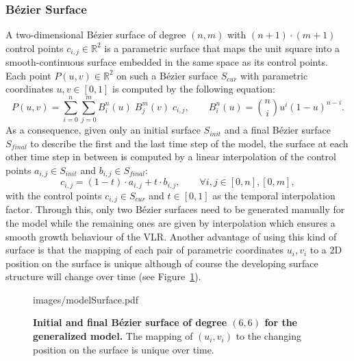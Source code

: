 \documentclass[11pt,a4paper, draft]{article}
\begin{document}
\subsubsection{B\'ezier Surface}
A two-dimensional B\'ezier surface of degree $(n, m)$ with $(n+1) \cdot (m+1)$ control points $c_{i, j} \in \mathbb{R}^2$ is a parametric surface that maps the unit square into a smooth-continuous surface embedded in the same space as its control points. Each point $P(u, v) \in \mathbb{R}^2$ on such a B\'ezier surface $S_{cur}$ with parametric coordinates $u ,v \in [0,1]$ is computed by the following equation:
\begin{equation}
P(u, v) = \sum_{i=0}^{n} \sum_{j=0}^{m} B_{i}^{n} (u) \; B_{j}^{m} (v) \; c_{i,j}, \qquad B_{i}^{n} (u) = \binom{n}{i} u^i (1-u)^{n-i}.
\end{equation}
As a consequence, given only an initial surface $S_{init}$ and a final B\'ezier surface $S_{final}$ to describe the first and the last time step of the model, the surface at each other time step in between is computed by a linear interpolation of the control points $a_{i,j} \in S_{init}$ and $b_{i,j} \in S_{final}$:
\begin{equation}
c_{i,j} = (1-t) \cdot a_{i,j} + t \cdot b_{i,j}, \qquad \forall i, j \in [0, n], [0, m],
\end{equation}
with the control points $c_{i,j} \in S_{cur}$ and $t \in [0,1]$ as the temporal interpolation factor. Through this, only two B\'ezier surfaces need to be generated manually for the model while the remaining ones are given by interpolation which ensures a smooth growth behaviour of the VLR. Another advantage of using this kind of surface is that the mapping of each pair of parametric coordinates $u_i, v_i$ to a 2D position on the surface is unique although of course the developing surface structure will change over time (see Figure~\ref{fig:modelSurface}).
%
\begin{figure}[htbp]
	\begin{center}
		\begin{overpic}[width=1.\linewidth]{images/modelSurface.pdf}
		\end{overpic}
\caption[Initial and final B\'ezier surface of degree $(6, 6)$ for the generalized model.]
{
{\bf Initial and final B\'ezier surface of degree $(6, 6)$ for the generalized model.} The mapping of $(u_i, v_i)$ to the changing position on the surface is unique over time.
}
	\label{fig:modelSurface}
	\end{center}
\end{figure}
%
\end{document}
